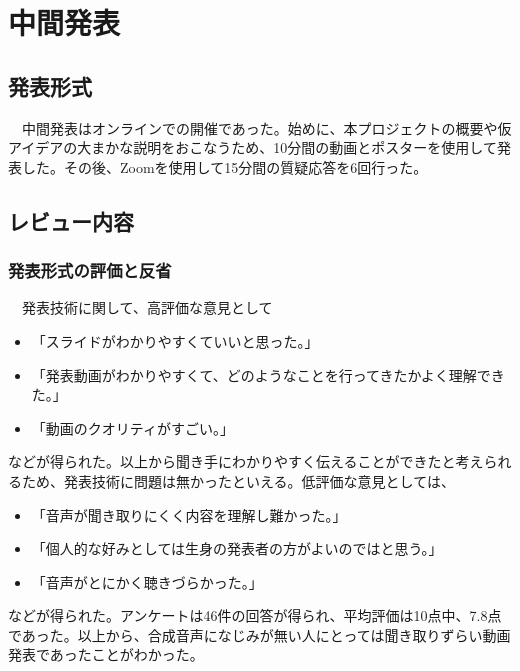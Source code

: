 \chapter{中間発表}

\section{発表形式}
　中間発表はオンラインでの開催であった。始めに、本プロジェクトの概要や仮アイデアの大まかな説明をおこなうため、10分間の動画とポスターを使用して発表した。その後、Zoomを使用して15分間の質疑応答を6回行った。

\section{レビュー内容}
\subsection{発表形式の評価と反省}
　発表技術に関して、高評価な意見として
\begin{itemize}
    \item 「スライドがわかりやすくていいと思った。」
    \item 「発表動画がわかりやすくて、どのようなことを行ってきたかよく理解できた。」
    \item 「動画のクオリティがすごい。」
\end{itemize}
などが得られた。以上から聞き手にわかりやすく伝えることができたと考えられるため、発表技術に問題は無かったといえる。低評価な意見としては、
\begin{itemize}
    \item 「音声が聞き取りにくく内容を理解し難かった。」
    \item 「個人的な好みとしては生身の発表者の方がよいのではと思う。」
    \item 「音声がとにかく聴きづらかった。」
\end{itemize}
などが得られた。アンケートは46件の回答が得られ、平均評価は10点中、7.8点であった。以上から、合成音声になじみが無い人にとっては聞き取りずらい動画発表であったことがわかった。

